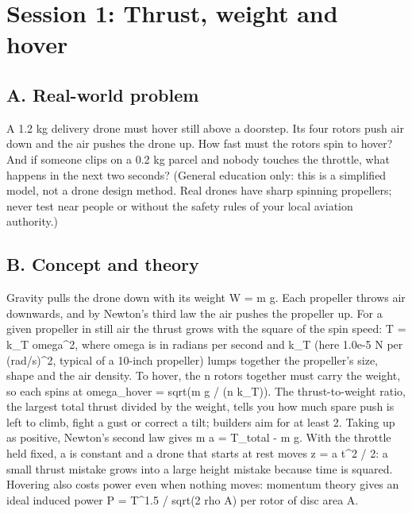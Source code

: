\documentclass[11pt,a4paper]{article}
\begin{document}
\section{Session 1: Thrust, weight and hover}

\subsection*{A. Real-world problem}
A 1.2 kg delivery drone must hover still above a doorstep. Its four rotors push air down and the air pushes the drone up. How fast must the rotors spin to hover? And if someone clips on a 0.2 kg parcel and nobody touches the throttle, what happens in the next two seconds? (General education only: this is a simplified model, not a drone design method. Real drones have sharp spinning propellers; never test near people or without the safety rules of your local aviation authority.)

\subsection*{B. Concept and theory}
Gravity pulls the drone down with its weight W = m g. Each propeller throws air downwards, and by Newton's third law the air pushes the propeller up. For a given propeller in still air the thrust grows with the square of the spin speed: T = k\_T omega\textasciicircum{}2, where omega is in radians per second and k\_T (here 1.0e-5 N per (rad/s)\textasciicircum{}2, typical of a 10-inch propeller) lumps together the propeller's size, shape and the air density. To hover, the n rotors together must carry the weight, so each spins at omega\_hover = sqrt(m g / (n k\_T)). The thrust-to-weight ratio, the largest total thrust divided by the weight, tells you how much spare push is left to climb, fight a gust or correct a tilt; builders aim for at least 2. Taking up as positive, Newton's second law gives m a = T\_total - m g. With the throttle held fixed, a is constant and a drone that starts at rest moves z = a t\textasciicircum{}2 / 2: a small thrust mistake grows into a large height mistake because time is squared. Hovering also costs power even when nothing moves: momentum theory gives an ideal induced power P = T\textasciicircum{}1.5 / sqrt(2 rho A) per rotor of disc area A.
\end{document}
